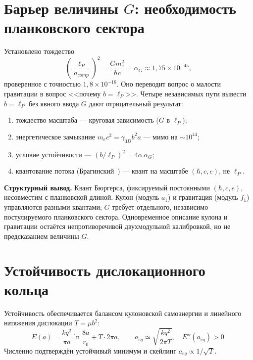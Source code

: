 \documentclass[11pt,a4paper]{article}
\begin{document}
\section{Барьер величины $G$: необходимость планковского сектора}
Установлено тождество
\begin{equation}
\left(\frac{\ell_P}{a_{comp}}\right)^2=\frac{Gm_e^2}{\hbar c}=\alpha_G
\approx1{,}75\times10^{-45},
\end{equation}
проверенное с точностью $1{,}8\times10^{-16}$. Оно переводит вопрос о
малости гравитации в вопрос <<почему $b=\ell_P$>>. Четыре независимых пути
вывести $b=\ell_P$ без явного ввода $G$ дают отрицательный результат:
\begin{enumerate}
\item тождество масштаба --- круговая зависимость ($G$ в $\ell_P$);
\item энергетическое замыкание $m_ec^2=\gamma_{3D}b^2a$ --- мимо на $\sim10^{44}$;
\item условие устойчивости --- $(b/\ell_P)^2=4\alpha\,\alpha_G$;
\item квантование потока (Брагинский~\cite{Braginsky2018}) --- квант на масштабе $(\hbar,c,e)$, не $\ell_P$.
\end{enumerate}
\textbf{Структурный вывод.} Квант Бюргерса, фиксируемый постоянными
$(\hbar,c,e)$, несовместим с планковской длиной. Кулон (модуль $a_1$) и
гравитация (модуль $f_1$) управляются разными квантами; $G$ требует
отдельного, независимо постулируемого планковского сектора. Одновременное
описание кулона и гравитации остаётся непротиворечивой двухмодульной
калибровкой, но не предсказанием величины $G$.

\section{Устойчивость дислокационного кольца}
Устойчивость обеспечивается балансом кулоновской самоэнергии и линейного
натяжения дислокации $T=\mu b^2$:
\begin{equation}
E(a)=\frac{kq^2}{\pi a}\ln\frac{8a}{r_0}+T\cdot2\pi a,\qquad
a_{eq}\simeq\sqrt{\frac{kq^2}{2\pi T}},\quad E''(a_{eq})>0.
\end{equation}
Численно подтверждён устойчивый минимум и скейлинг $a_{eq}\propto1/\sqrt{T}$.
\end{document}
